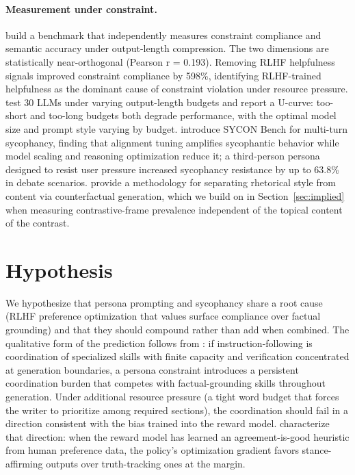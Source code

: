 \documentclass[11pt]{article}
\begin{document}
\paragraph{Measurement under constraint.}
\citet{baxi_compliance_2025} build a benchmark that independently measures
constraint compliance and semantic accuracy under output-length
compression. The two dimensions are statistically near-orthogonal
(Pearson r = 0.193). Removing RLHF helpfulness signals improved constraint
compliance by 598\%, identifying RLHF-trained helpfulness as the dominant
cause of constraint violation under resource pressure.
\citet{sun_length_2025} test 30 LLMs under varying output-length budgets
and report a U-curve: too-short and too-long budgets both degrade
performance, with the optimal model size and prompt style varying by
budget. \citet{hong_sycon_2025} introduce SYCON Bench for multi-turn
sycophancy, finding that alignment tuning amplifies sycophantic
behavior while model scaling and reasoning optimization reduce it; a
third-person persona designed to resist user pressure increased
sycophancy resistance by up to 63.8\% in debate scenarios.
\citet{qiu_rhetorical_2025} provide a methodology for separating
rhetorical style from content via counterfactual generation, which we
build on in Section~\ref{sec:implied} when measuring contrastive-frame
prevalence independent of the topical content of the contrast.

\section{Hypothesis}
\label{sec:hypothesis}

We hypothesize that persona prompting and sycophancy share a root cause
(RLHF preference optimization that values surface compliance over factual
grounding) and that they should compound rather than add when combined.
The qualitative form of the prediction follows from
\citet{rocchetti_instructions_2026}: if instruction-following is
coordination of specialized skills with finite capacity and verification
concentrated at generation boundaries, a persona constraint introduces a
persistent coordination burden that competes with factual-grounding
skills throughout generation. Under additional resource pressure (a tight
word budget that forces the writer to prioritize among required
sections), the coordination should fail in a direction consistent with
the bias trained into the reward model. \citet{shapira_rlhf_2026}
characterize that direction: when the reward model has learned an
agreement-is-good heuristic from human preference data, the policy's
optimization gradient favors stance-affirming outputs over truth-tracking
ones at the margin.
\end{document}
